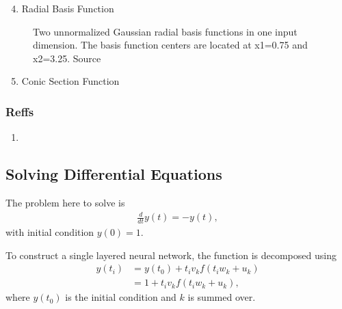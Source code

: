 \documentclass[letterpaper,12pt,english]{sphinxmanual}
\begin{document}
\begin{enumerate}
\setcounter{enumi}{3}
\item {} 
Radial Basis Function

\end{enumerate}
\begin{figure}[htbp]
\centering
\capstart

\noindent{}
\caption{Two unnormalized Gaussian radial basis functions in one input dimension. The basis function centers are located at x1=0.75 and x2=3.25. Source }\label{\detokenize{artificial-neural-network/ann:id6}}\end{figure}
\begin{enumerate}
\setcounter{enumi}{4}
\item {} 
Conic Section Function

\end{enumerate}


\subsubsection{Reffs}
\label{\detokenize{artificial-neural-network/ann:reffs}}\begin{enumerate}
\item {} 

\end{enumerate}


\subsection{Solving Differential Equations}
\label{\detokenize{artificial-neural-network/ann:solving-differential-equations}}
The problem here to solve is
\begin{equation*}
\begin{split}\frac{d}{dt}y(t)= - y(t),\end{split}
\end{equation*}
with initial condition \(y(0)=1\).

To construct a single layered neural network, the function is decomposed using
\begin{equation*}
\begin{split}y(t_i)& = y(t_0) + t_i v_k f(t_i w_k+u_k) \\
&= 1+t_i v_k f(t_i w_k+u_k) ,\end{split}
\end{equation*}
where \(y(t_0)\) is the initial condition and \(k\) is summed over.
\end{document}
